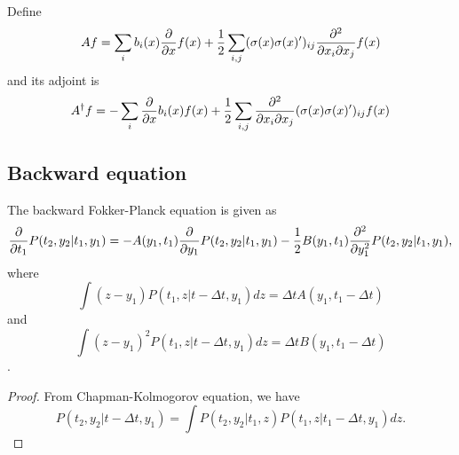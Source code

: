 \begin{refsection}
\begin{corollary}
	Define 
	$$Af = \sum_{i} b_i(x) \frac{\partial }{\partial x}f(x) + \frac{1}{2}\sum_{i,j}(\sigma(x)\sigma(x)')_{ij}\frac{\partial^2 }{\partial x_i\partial x_j}f(x)$$
	and its adjoint is
	$$A^{\dagger}f = -\sum_{i}  \frac{\partial }{\partial x}b_i(x)f(x) + \frac{1}{2}\sum_{i,j}\frac{\partial^2 }{\partial x_i\partial x_j}(\sigma(x)\sigma(x)')_{ij}f(x)$$
\end{corollary}

\subsection{Backward equation}
\begin{lemma}
The backward Fokker-Planck equation is given as
$$\frac{\partial}{\partial t_1}P(t_2,y_2|t_1,y_1) = - A(y_1,t_1)\frac{\partial}{\partial y_1}P(t_2,y_2|t_1,y_1) - \frac{1}{2}B(y_1,t_1)\frac{\partial^2}{\partial y_1^2} P(t_2,y_2|t_1,y_1),$$
where $$\int (z-y_1)P(t_1,z|t-\Delta t,y_1)dz = \Delta t A(y_1,t_1-\Delta t)$$ and $$\int (z-y_1)^2P(t_1,z|t-\Delta t,y_1)dz = \Delta t B(y_1,t_1-\Delta t)$$.
\end{lemma}
\begin{proof}
From Chapman-Kolmogorov equation, we have
	$$P(t_2,y_2|t-\Delta t,y_1) = \int P(t_2,y_2|t_1,z)P(t_1,z|t_1-\Delta t,y_1)dz.$$
	

\end{proof}
\end{refsection}
